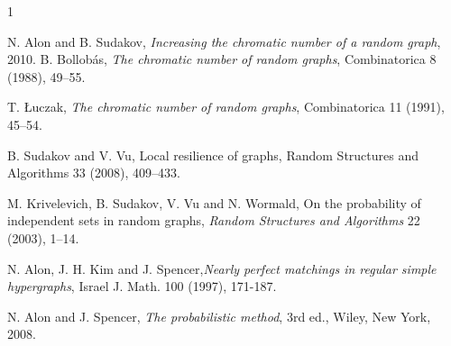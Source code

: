 \documentclass[10pt,journal,a4paper]{IEEEtran}
\theoremstyle{definition}   %
\begin{document}
\begin{thebibliography}{1}

N. Alon and B. Sudakov, \textit{Increasing the chromatic number of a random graph}, 2010.
B. Bollob\'as, \textit{The chromatic number of random graphs}, Combinatorica 8 (1988), 49–55.

T. \L{}uczak, \textit{The chromatic number of random graphs}, Combinatorica 11 (1991), 45–54.

B. Sudakov and V. Vu, Local resilience of graphs, Random Structures and Algorithms 33 (2008), 409–433.

M. Krivelevich, B. Sudakov, V. Vu and N. Wormald, On the probability of independent sets in random graphs, \textit{Random Structures and Algorithms} 22 (2003), 1–14.

N. Alon, J. H. Kim and J. Spencer,\textit{Nearly perfect matchings in regular simple hypergraphs}, Israel J. Math. 100 (1997), 171-187.

N. Alon and J. Spencer, \textit{The probabilistic method}, 3rd ed., Wiley, New York, 2008.
\end{thebibliography}
\end{document}
